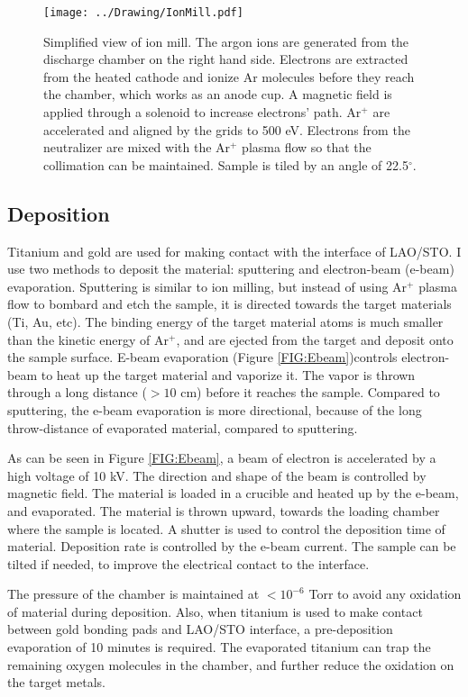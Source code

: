\documentclass[pdftex, sectionletters]{pittetd}    %
\begin{document}
\begin{figure}[hp]
	\centering
	\texttt{[image: ../Drawing/IonMill.pdf]}
	\caption{Simplified view of ion mill. The argon ions are generated from the discharge chamber on the right hand side. Electrons are extracted from the heated cathode and ionize Ar molecules before they reach the chamber, which works as an anode cup. A magnetic field is applied through a solenoid to increase electrons' path. Ar$^{+}$ are accelerated and aligned by the grids to 500 eV. Electrons from the neutralizer are mixed with the Ar$^{+}$ plasma flow so that the collimation can be maintained. Sample is tiled by an angle of 22.5$^{\circ}$.}
	\label{FIG:IonMill}
\end{figure}

\subsection{Deposition}

Titanium and gold are used for making contact with the interface of LAO/STO. I use two methods to deposit the material: sputtering and electron-beam (e-beam) evaporation. Sputtering is similar to ion milling, but instead of using Ar$^{+}$ plasma flow to bombard and etch the sample, it is directed towards the target materials (Ti, Au, etc). The binding energy of the target material atoms is much smaller than the kinetic energy of Ar$^{+}$, and are ejected from the target and deposit onto the sample surface. E-beam evaporation (Figure \ref{FIG:Ebeam})controls electron-beam to heat up the target material and vaporize it. The vapor is thrown through a long distance ($> 10$ cm) before it reaches the sample. Compared to sputtering, the e-beam evaporation is more directional, because of the long throw-distance of evaporated material, compared to sputtering. 

As can be seen in Figure \ref{FIG:Ebeam}, a beam of electron is accelerated by a high voltage of 10 kV. The direction and shape of the beam is controlled by magnetic field. The material is loaded in a crucible and heated up by the e-beam, and evaporated. The material is thrown upward, towards the loading chamber where the sample is located. A shutter is used to control the deposition time of material. Deposition rate is controlled by the e-beam current. The sample can be tilted if needed, to improve the electrical contact to the interface.

The pressure of the chamber is maintained at $< 10^{-6}$ Torr to avoid any oxidation of material during deposition. Also, when titanium is used to make contact between gold bonding pads and LAO/STO interface, a pre-deposition evaporation of 10 minutes is required. The evaporated titanium can trap the remaining oxygen molecules in the chamber, and further reduce the oxidation on the target metals. 
\end{document}
